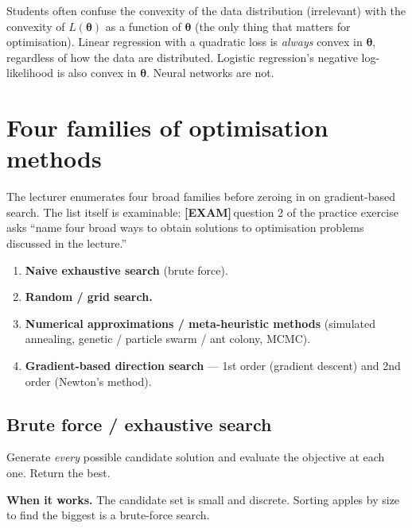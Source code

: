 \documentclass[11pt, a4paper]{article}
\newcommand{\examflag}{\textcolor{tipBd}{\textbf{[EXAM]}}\,}
\begin{document}
\begin{pitfallbox}
Students often confuse the convexity of the data distribution (irrelevant) with the convexity of $L(\boldsymbol\theta)$ as a function of $\boldsymbol\theta$ (the only thing that matters for optimisation). Linear regression with a quadratic loss is \emph{always} convex in $\boldsymbol\theta$, regardless of how the data are distributed. Logistic regression's negative log-likelihood is also convex in $\boldsymbol\theta$. Neural networks are not.
\end{pitfallbox}

\section{Four families of optimisation methods}

The lecturer enumerates four broad families before zeroing in on gradient-based search. The list itself is examinable: \examflag{}question 2 of the practice exercise asks ``name four broad ways to obtain solutions to optimisation problems discussed in the lecture.''

\begin{enumerate}
  \item \textbf{Naive exhaustive search} (brute force).
  \item \textbf{Random / grid search.}
  \item \textbf{Numerical approximations / meta-heuristic methods} (simulated annealing, genetic / particle swarm / ant colony, MCMC).
  \item \textbf{Gradient-based direction search} — 1st order (gradient descent) and 2nd order (Newton's method).
\end{enumerate}

\subsection{Brute force / exhaustive search}

\begin{defbox}
Generate \emph{every} possible candidate solution and evaluate the objective at each one. Return the best.
\end{defbox}

\textbf{When it works.} The candidate set is small and discrete. Sorting apples by size to find the biggest is a brute-force search.
\end{document}
